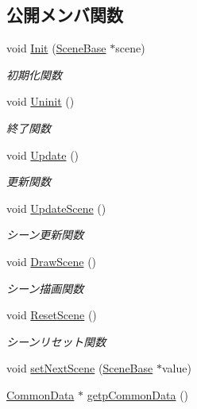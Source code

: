 \subsection*{公開メンバ関数}
\begin{DoxyCompactItemize}
\item 
void \mbox{\hyperlink{class_scene_manager_a3d14c04a921c6c670e89fbf22a719b00}{Init}} (\mbox{\hyperlink{class_scene_base}{Scene\+Base}} $\ast$scene)
\begin{DoxyCompactList}\small\item\em 初期化関数 \end{DoxyCompactList}\item 
void \mbox{\hyperlink{class_scene_manager_ae3ff21f2261fc50f1e860cf7fc3a2108}{Uninit}} ()
\begin{DoxyCompactList}\small\item\em 終了関数 \end{DoxyCompactList}\item 
void \mbox{\hyperlink{class_scene_manager_a63dcf65832d6a2c190bf496d9a3b00a3}{Update}} ()
\begin{DoxyCompactList}\small\item\em 更新関数 \end{DoxyCompactList}\item 
void \mbox{\hyperlink{class_scene_manager_a493bc0d65558ce004f6f248a185ba956}{Update\+Scene}} ()
\begin{DoxyCompactList}\small\item\em シーン更新関数 \end{DoxyCompactList}\item 
void \mbox{\hyperlink{class_scene_manager_a828b35826f757b8af34aa767c6b40378}{Draw\+Scene}} ()
\begin{DoxyCompactList}\small\item\em シーン描画関数 \end{DoxyCompactList}\item 
void \mbox{\hyperlink{class_scene_manager_a1759161a38025ec8212dc98439fd7335}{Reset\+Scene}} ()
\begin{DoxyCompactList}\small\item\em シーンリセット関数 \end{DoxyCompactList}\item 
void \mbox{\hyperlink{class_scene_manager_a208cc1690dcb260ae7fb94d13118f6ce}{set\+Next\+Scene}} (\mbox{\hyperlink{class_scene_base}{Scene\+Base}} $\ast$value)
\item 
\mbox{\hyperlink{class_scene_manager_1_1_common_data}{Common\+Data}} $\ast$ \mbox{\hyperlink{class_scene_manager_a53145632c87301427f9cedc3345d2557}{getp\+Common\+Data}} ()

\end{DoxyCompactItemize}
